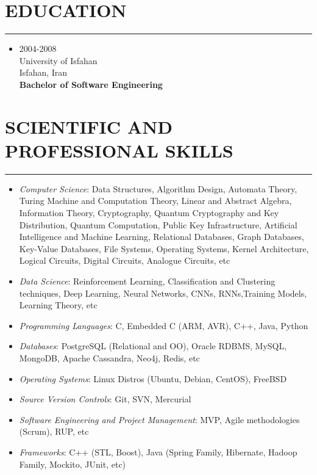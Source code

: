 \documentclass[10pt,a4paper]{article}
\begin{document}

\section{EDUCATION}
\noindent \rule {3.0cm}{0.4pt}
  \begin{itemize}
    \item \small {2004-2008 \\
                  University of Isfahan \\
                  Isfahan, Iran \\
                  \textbf{Bachelor of Software Engineering}}
  \end{itemize}



\section{SCIENTIFIC AND PROFESSIONAL SKILLS}
\noindent \rule {10.0cm}{0.4pt}
\begin{itemize}
  \setlength{\rightskip}{2cm}
  \setlength\itemsep{0em}
  \item \small \textit {Computer Science}:
  Data Structures, Algorithm Design, Automata Theory, Turing Machine and Computation Theory, Linear and Abstract Algebra, Information Theory, Cryptography, Quantum Cryptography and Key Distribution, Quantum Computation, Public Key Infrastructure, Artificial Intelligence and Machine Learning,  Relational Databases, Graph Databases, Key-Value Databases, File Systems, Operating Systems, Kernel Architecture, Logical Circuits, Digital Circuits, Analogue Circuits, etc
  \item \small \textit{Data Science}:
  Reinforcement Learning, Classification and Clustering techniques, Deep Learning, Neural Networks, CNNs, RNNs,Training Models, Learning Theory, etc
  \item \small \textit {Programming Languages}: C, Embedded C (ARM, AVR), C++, Java, Python
  \item \small \textit {Databases}: PostgreSQL (Relational and OO), Oracle RDBMS, MySQL, MongoDB, Apache Cassandra, Neo4j, Redis, etc
  \item \small \textit {Operating Systems}: Linux Distros (Ubuntu, Debian, CentOS), FreeBSD
  \item \small \textit {Source Version Controls}: Git, SVN, Mercurial
  \item \small \textit {Software Engineering and Project Management}: MVP, Agile methodologies (Scrum), RUP, etc
  \item \small \textit {Frameworks}: C++ (STL, Boost), Java (Spring Family, Hibernate, Hadoop Family, Mockito, JUnit, etc)
\end{itemize}
\end{document}
